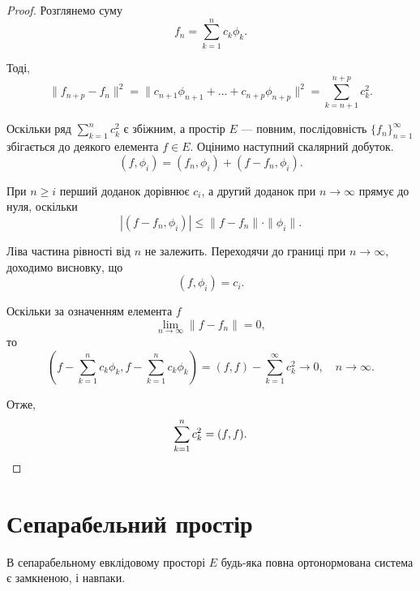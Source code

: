 \begin{proof}
Розглянемо суму
\begin{equation*}
    f_n = \sum_{k = 1}^n c_k \phi_k.
\end{equation*}

Тоді,
\begin{equation*}
    \|f_{n + p} - f_n\|^2 =
    \|c_{n + 1} \phi_{n + 1} + \dots + c_{n + p} \phi_{n + p}\|^2 =
    \sum_{k = n + 1}^{n + p} c_k^2.
\end{equation*}

Оскільки ряд $\sum_{k = 1}^n c_k^2$ є збіжним, а простір $E$ --- повним,
послідовність $\{f_n\}_{n = 1}^\infty$ збігається до деякого елемента
$f \in E$. Оцінимо наступний скалярний добуток.
\begin{equation*}
    (f, \phi_i) = (f_n, \phi_i) + (f - f_n, \phi_i).
\end{equation*}

При $n \ge i$ перший доданок дорівнює $c_i$, а другий доданок
при $n \to \infty$ прямує до нуля, оскільки
\begin{equation*}
    |(f - f_n, \phi_i)| \le \|f - f_n\| \cdot \|\phi_i\|.
\end{equation*}

Ліва частина рівності від $n$ не залежить. Переходячи до
границі при $n \to \infty$, доходимо висновку, що
\begin{equation*}
    (f, \phi_i) = c_i.
\end{equation*}

Оскільки за означенням елемента $f$
\begin{equation*}
    \lim_{n \to \infty} \|f - f_n\| = 0,
\end{equation*}
то
\begin{equation*}
    \left( f - \sum_{k =1}^n c_k \phi_k, f - \sum_{k =1}^n c_k \phi_k \right) =
    (f, f) - \sum_{k = 1}^\infty c_k^2 \to 0, \quad n \to \infty.
\end{equation*}

Отже,
\begin{equation*}
    \sum_{k = 1}^n c_k^2 = (f, f). \qedhere
\end{equation*}
\end{proof}

\section{Сепарабельний простір}

\begin{theorem}
В сепарабельному евклідовому просторі $E$
будь-яка повна ортонормована система є замкненою, і
навпаки.
\end{theorem}

